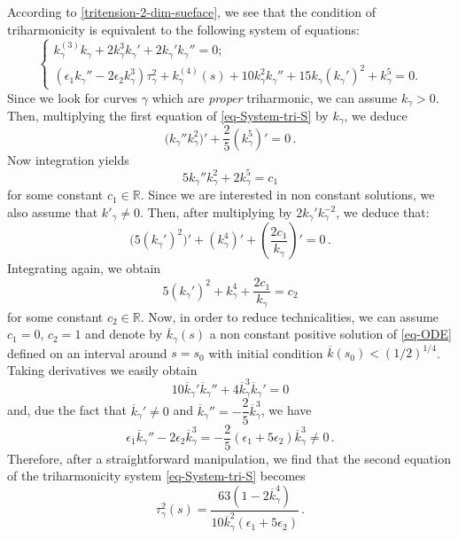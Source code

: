 \documentclass[11pt]{amsart}
\theoremstyle{plain}
\theoremstyle{definition}
\numberwithin{equation}{section}
\def \R{{\mathbb R}}
\begin{document}
According to \eqref{tritension-2-dim-sueface}, we  see that the condition of triharmonicity is equivalent to the following system of equations:
\begin{equation}\label{eq-System-tri-S}
\begin{cases}
 k_\gamma^{(3)} k_\gamma + 2  k_\gamma^3  k_\gamma' + 2 k_\gamma'k_\gamma''= 0;\\[1.5ex]
 (\epsilon_1 k_\gamma''-2 \epsilon_2 k_\gamma^3 ) \tau_\gamma^2 +k_\gamma^{(4)}(s) + 10 k_\gamma^2 k_\gamma'' + 15 k_\gamma (k_\gamma ')^2+ k_\gamma^5 = 0.
\end{cases} 
\end{equation}
Since we look for curves $\gamma$ which are \textit{proper} triharmonic, we can assume $k_\gamma > 0$. Then, multiplying  the first equation of \eqref{eq-System-tri-S} by $k_\gamma$, we deduce
\[
\big( k_\gamma'' k_\gamma^2 \big)' + \dfrac{2}{5}(k_\gamma^5)' = 0 \,.
\]
Now integration yields 
$$5k_\gamma'' k_\gamma^2 + 2k_\gamma^5 = c_1
$$ 
for some constant $c_1\in\R$. Since we are interested in non constant solutions, we also assume that $k'_\gamma \neq 0$. Then, after multiplying by $2 k_\gamma' k_\gamma^{-2}$, we deduce that:
\[
\big(5(k_\gamma')^2\big)' + (k_\gamma^4)' + \left( \dfrac{2c_1}{k_\gamma} \right)' = 0\,.
\]
Integrating again, we obtain 
\begin{equation}\label{eq-ODE}
5(k_\gamma')^2 +  k_\gamma^4 +  \dfrac{2c_1}{k_\gamma} = c_2 
\end{equation}
for some constant $c_2\in\R$. Now, in order to reduce technicalities, we can assume $c_1 = 0$, $c_2 = 1$ and denote by $\overline{k}_\gamma(s)$ a non constant positive solution of \eqref{eq-ODE} defined on an interval around $s=s_0$ with initial condition $\overline{k}(s_0)<(1/2)^{1/4}$.
Taking derivatives we easily obtain 
\[
10 \overline{k}_\gamma' \overline{k}_\gamma'' + 4 \overline{k}_\gamma^3 \overline{k}_\gamma' = 0
\]
 and, due the fact that $\overline{k}_\gamma' \neq 0$ and $\overline{k}_\gamma'' = -\dfrac{2}{5}\overline{k}_\gamma^3$, we have
\[
\epsilon_1 \overline{k}_\gamma'' -2\epsilon_2 \overline{k}_\gamma^3 = - \frac{2}{5} \left( \epsilon_1 + 5\epsilon_2\right)\overline{k}_\gamma^3 \neq 0 \,.
\]
Therefore, after a straightforward manipulation, we find that the second equation of the triharmonicity system \eqref{eq-System-tri-S} becomes
\begin{equation}\label{eq:taugammainkbar}
{\tau}^2_\gamma(s)= \frac{63(1-2 \overline{k}_\gamma^4)}{10 \overline{k}_\gamma^2(\epsilon_1+5\epsilon_2)}\,.
\end{equation}
\end{document}
